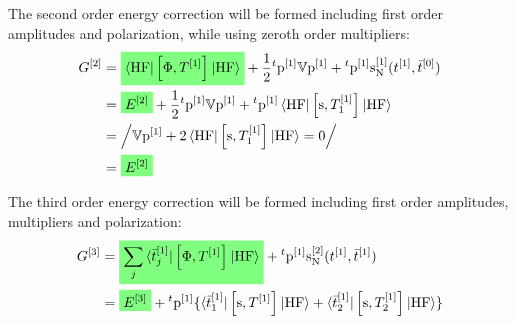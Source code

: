 The second order energy correction will be formed including first order
amplitudes and polarization, while using zeroth order multipliers:
\begin{equation}\label{eq:second-order-G}
  \begin{aligned}
  G^{[2]} &=
  \highlight{green}{
  \braket{\mathrm{HF} | \commutator{\Phi}{T^{[1]}} | \mathrm{HF}}
  }
  + \frac{1}{2}{}^t\p^{[1]}\V\p^{[1]} +
  {}^t\p^{[1]}\s_{\mathrm{N}}^{[1]}(\tamp{}^{[1]}, \tbar{}^{[0]}) \\
  &= \highlight{green}{E^{[2]}}
  +
  \frac{1}{2}{}^t\p^{[1]}\V\p^{[1]}
  +
  {}^t\p^{[1]}\braket{\mathrm{HF} | \commutator{\s}{T^{[1]}_1} | \mathrm{HF}} \\
  &= \left/
  \V\p^{[1]} + 2\braket{\mathrm{HF} | \commutator{\s}{T_1^{[1]}}| \mathrm{HF}} = 0
  \right/ \\
  &= \highlight{green}{E^{[2]}}
  \end{aligned}
\end{equation}

The third order energy correction will be formed including first order
amplitudes, multipliers and polarization:
\begin{equation}\label{eq:third-order-G}
  \begin{aligned}
    G^{[3]} &=
    \highlight{green}{\sum_j\braket{\tbar{j}^{[1]} | \commutator{\Phi}{T^{[1]}} | \mathrm{HF}}}
    + {}^t\p^{[1]}\s_{\mathrm{N}}^{[2]}(\tamp{}^{[1]}, \tbar{}^{[1]}) \\
    &=
    \highlight{green}{E^{[3]}}
    + {}^t\p^{[1]}
    \lbrace
      \braket{\tbar{1}^{[1]} | \commutator{\s}{T^{[1]}} | \mathrm{HF}}
    + \braket{\tbar{2}^{[1]} | \commutator{\s}{T^{[1]}_2} | \mathrm{HF}}
    \rbrace
  \end{aligned}
\end{equation}

